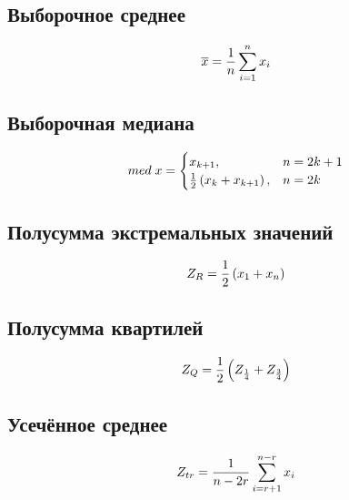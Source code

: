 \documentclass[12pt]{article}
\begin{document}
\subsection{Выборочное среднее \cite{average}}

\begin{equation}
\overline{x} = \frac{1}{n}\sum_{i=1}^n x_i \hfill \label{eqn:average}
\end{equation}

\subsection{Выборочная медиана \cite{med}}

\begin{equation}
med\; x = \begin{cases}
x_{k+1}, & n = 2k+1\\
\frac{1}{2}\left(x_k+x_{k+1}\right), & n = 2k
\end{cases} \hfill  \label{eqn:med}
\end{equation}

\subsection{Полусумма экстремальных значений \cite{mean_extr}}

\begin{equation} 
Z_R = \frac{1}{2}\left(x_1+x_n\right) \hfill  \label{eqn:mean_extr}
\end{equation}

\subsection{Полусумма квартилей \cite{quartiles}}

\begin{equation}
Z_Q = \frac{1}{2}\left(Z_{\frac{1}{4}}+Z_{\frac{3}{4}}\right) \hfill  
\label{eqn:quartiles}
\end{equation}

\subsection{Усечённое среднее \cite{cut_mean}}

\begin{equation}
Z_{tr} = \frac{1}{n - 2r}\sum_{i=r+1}^{n-r} x_i \hfill  \label{eqn:cut_mean}
\end{equation}

\pagebreak
\end{document}
